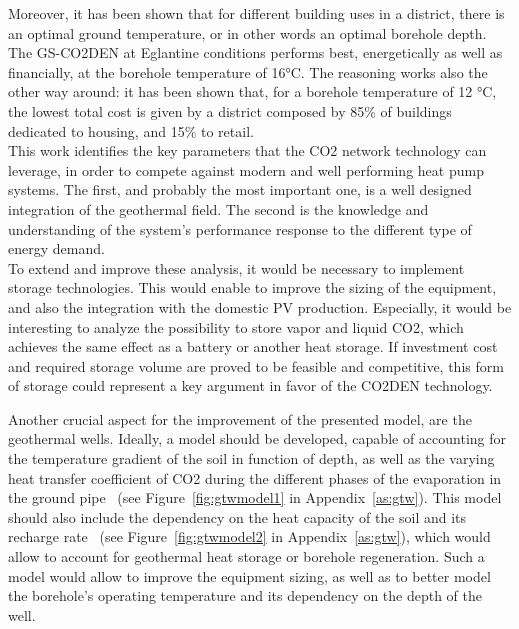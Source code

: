 \documentclass{article}
\begin{document}
Moreover, it has been shown that for different building uses in a district, there is an optimal ground temperature, or in other words an optimal borehole depth. The GS-CO2DEN at Eglantine conditions performs best, energetically as well as financially, at the borehole temperature of 16\si{\celsius}. The reasoning works also the other way around: it has been shown that, for a borehole temperature of 12 \si{\celsius}, the lowest total cost is given by a district composed by 85\% of buildings dedicated to housing, and 15\% to retail.\\

This work identifies the key parameters that the CO2 network technology can leverage, in order to compete against modern and well performing heat pump systems. The first, and probably the most important one, is a well designed integration of the geothermal field. The second is the knowledge and understanding of the system's performance response to the different type of energy demand.\\

To extend and improve these analysis, it would be necessary to implement storage technologies. This would enable to improve the sizing of the equipment, and also the integration with the domestic PV production. Especially, it would be interesting to analyze the possibility to store vapor and liquid CO2, which achieves the same effect as a battery or another heat storage. If investment cost and required storage volume are proved to be feasible and competitive, this form of storage could represent a key argument in favor of the CO2DEN technology.

Another crucial aspect for the improvement of the presented model, are the geothermal wells. 
Ideally, a model should be developed, capable of accounting for the temperature gradient of the soil in function of depth, as well as the varying heat transfer coefficient of CO2 during the different phases of the evaporation in the ground pipe~\cite{badacheExperimentalStudyCarbon2018,lamarcheReviewMethodsEvaluate2010} (see Figure~\ref{fig:gtwmodel1} in Appendix~\ref{as:gtw}).
This model should also include the dependency on the heat capacity of the soil and its recharge rate~\cite{jiaReviewEffectiveThermal2019,lamarcheReviewMethodsEvaluate2010,zengHeatTransferAnalysis2003} (see Figure~\ref{fig:gtwmodel2} in Appendix~\ref{as:gtw}), which would allow to account for geothermal heat storage or borehole regeneration.
Such a model would allow to improve the equipment sizing, as well as to better model the borehole's operating temperature and its dependency on the depth of the well.
\end{document}
